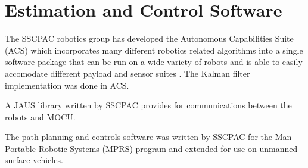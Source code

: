 \section{Estimation and Control Software}
\label{sec:bgSoftware}
The SSCPAC robotics group has developed the Autonomous Capabilities Suite (ACS) which incorporates many different robotics related algorithms into a single software package that can be run on a wide variety of robots and is able to easily accomodate different payload and sensor suites \cite{Sights06}. The Kalman filter implementation was done in ACS.

A JAUS library written by SSCPAC provides for communications between the robots and MOCU.

The path planning and controls software was written by SSCPAC for the Man Portable Robotic Systems (MPRS) program and extended for use on unmanned surface vehicles.
